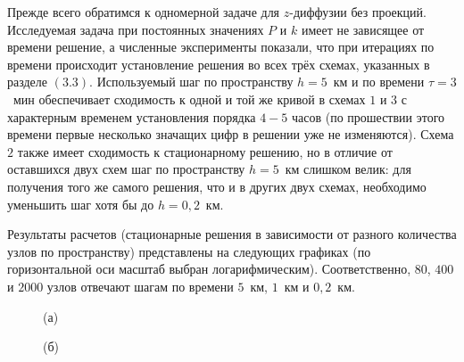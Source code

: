 \documentclass[14pt, a4paper, fleqn]{extarticle}
\begin{document}
Прежде всего обратимся к одномерной задаче для $z$-диффузии без проекций. Исследуемая задача при постоянных значениях $P$ и $k$ имеет не зависящее от времени решение, а численные эксперименты показали, что при итерациях по времени происходит установление решения во всех трёх схемах, указанных в разделе $(3.3)$. Используемый шаг по пространству $h = 5$~км и по времени $\tau = 3$~мин обеспечивает сходимость к одной и той же кривой в схемах $1$ и $3$ с характерным временем установления порядка $4-5$ часов (по прошествии этого времени первые несколько значащих цифр в решении уже не изменяются). Схема $2$ также имеет сходимость к стационарному решению, но в отличие от оставшихся двух схем шаг по пространству $h=5$~км слишком велик: для получения того же самого решения, что и в других двух схемах, необходимо уменьшить шаг хотя бы до $h = 0{,}2$~км.

Результаты расчетов (стационарные решения в зависимости от разного количества узлов по пространству) представлены на следующих графиках (по горизонтальной оси масштаб выбран логарифмическим). Соответственно, $80$, $400$ и $2000$ узлов отвечают шагам по времени $5$~км, $1$~км и $0{,}2$~км.
 
\begin{figure}[H]
(а)
\end{figure}

\begin{figure}[H]
(б)
\end{figure}
\end{document}
